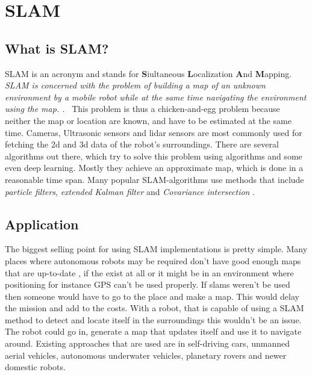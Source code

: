 
\chapter{SLAM\authorA}

\section{What is SLAM?}
SLAM is an acronym and stands for \textbf{S}iultaneous \textbf{L}ocalization \textbf{A}nd \textbf{M}apping.
\emph{\glqq SLAM is concerned with the problem of building a map of an unknown environment by a mobile robot while at the same time navigating the environment using the map. .\grqq}~\cite{slamfordummies} \newline
This problem is thus a chicken-and-egg problem because neither the map or location are known, and have to be estimated at the same time. Cameras, Ultrasonic sensors and lidar sensors are most commonly used for fetching the 2d and 3d data of the robot's surroundings. \newline
There are several algorithms out there, which try to solve this problem using algorithms and some even deep learning. Mostly they achieve an approximate map, which is done in a reasonable time span. Many popular SLAM-algorithms use methods that include \textit{particle filters}, \textit{extended Kalman filter} and \textit{Covariance intersection}\cite{slamfordummies} \cite{1678144}. \newline

\section{Application}
The biggest selling point for using SLAM implementations is pretty simple. Many places where autonomous robots may be required don't have good enough maps that are up-to-date , if the exist at all or it might be in an environment where positioning for instance GPS can't be used properly. If slams weren't be used then someone would have to go to the place and make a map. This would delay the mission and add to the costs. \newline
With a robot, that is capable of using a SLAM method to detect and locate itself in the surroundings this wouldn't be an issue. The robot could go in, generate a map that updates itself and use it to navigate around. \newline
Existing approaches that are used are in self-driving cars, unmanned aerial vehicles, autonomous underwater vehicles, planetary rovers and newer domestic robots.

